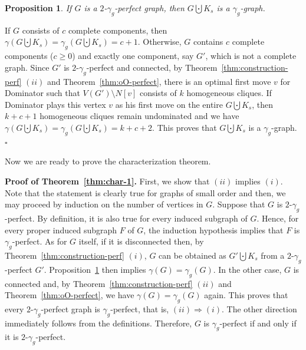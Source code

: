 \documentclass[12pt]{article}
\newtheorem{theorem}{Theorem}[section]
\newtheorem{proposition}[theorem]{Proposition}
\newcommand{\proof}{\noindent{\bf Proof.\ }}
\newcommand{\qed}{\hfill $\square$ \bigskip}
\newcommand{\cO}{{\cal O}}
\newcommand{\cQ}{{\cal Q}}
\begin{document}
\begin{proposition}
	\label{prop:disj-union}
If $G$ is a $2$-$\gamma_g$-perfect graph, then $G\bigcupdot  K_s$ is a  $\gamma_g$-graph.
\end{proposition}
\proof If $G$ consists of $c$ complete components, then $\gamma(G\bigcupdot  K_s)=\gamma_g(G\bigcupdot  K_s)=c+1$. Otherwise, $G$ contains $c$ complete components ($c\ge 0$) and  exactly one component, say  $G'$, which is not a complete graph. Since $G'$ is $2$-$\gamma_g$-perfect and connected, by Theorem~\ref{thm:construction-perf} $(ii)$ and Theorem~\ref{thm:oO-perfect}, there is an optimal first move $v$ for Dominator such that $V(G')\setminus N[v]$ consists of $k$ homogeneous cliques. If Dominator plays this vertex  $v$ as his first move on the entire $G\bigcupdot  K_s$, then $k+c+1$ homogeneous cliques remain undominated and we have $\gamma(G\bigcupdot  K_s)=\gamma_g(G\bigcupdot  K_s)= k+c+2$. This proves that $G\bigcupdot  K_s$ is a $\gamma_g$-graph. \qed




Now we are ready to prove the characterization theorem.
\medskip

\noindent \textbf{Proof of Theorem~\ref{thm:char-1}.} First, we show that $(ii)$ implies $(i)$. Note that the statement is clearly true for graphs of small order and then, we may proceed by induction on the number of vertices in $G$.  Suppose that $G$ is $2$-$\gamma_g$-perfect. By definition, it is also true for every induced subgraph of $G$. Hence, for every proper induced subgraph $F$ of $G$, the induction hypothesis implies that $F$ is $\gamma_g$-perfect. As for $G$ itself, if it is disconnected then, by Theorem~\ref{thm:construction-perf} $(i)$, $G$ can be obtained as $G' \bigcupdot  K_s$ from a $2$-$\gamma_g$-perfect $G'$.  Proposition~\ref{prop:disj-union} then implies $\gamma(G)=\gamma_g(G)$. In the other case, $G$ is connected and, by Theorem~\ref{thm:construction-perf} $(ii)$ and Theorem~\ref{thm:oO-perfect}, we have $\gamma(G)=\gamma_g(G)$ again. This proves that every $2$-$\gamma_g$-perfect graph is $\gamma_g$-perfect, that is, $(ii) \Rightarrow (i)$. The other direction immediately follows from the definitions. Therefore, $G$ is $\gamma_g$-perfect if and only if it is $2$-$\gamma_g$-perfect.
\end{document}
